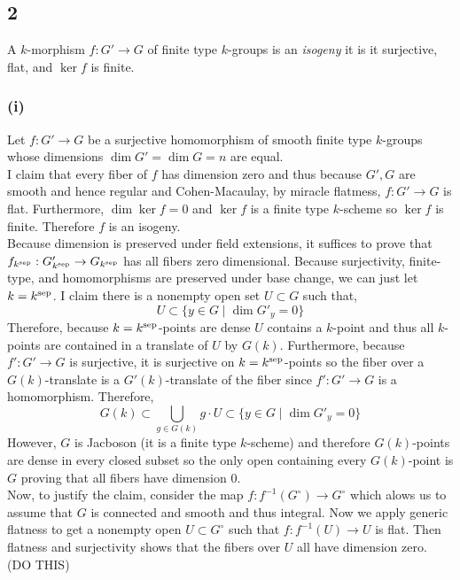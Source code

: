 \documentclass[12pt]{article}
\begin{document}
\subsection{2}

A $k$-morphism $f : G' \to G$ of finite type $k$-groups is an \textit{isogeny} it is it surjective, flat, and $\ker{f}$ is finite.

\subsubsection{(i)}

Let $f : G' \to G$ be a surjective homomorphism of smooth finite type $k$-groups whose dimensions $\dim{G'} = \dim{G} = n$ are equal. 
\bigskip\\
I claim that every fiber of $f$ has dimension zero and thus because $G', G$ are smooth and hence regular and Cohen-Macaulay, by miracle flatmess, $f : G' \to G$ is flat. Furthermore, $\dim{\ker{f}} = 0$ and $\ker{f}$ is a finite type $k$-scheme so $\ker{f}$ is finite. Therefore $f$ is an isogeny.
\bigskip\\
Because dimension is preserved under field extensions, it suffices to prove that $f_{k^{\mathrm{sep}}} : G'_{k^{\mathrm{sep}}} \to G_{k^{\mathrm{sep}}}$ has all fibers zero dimensional. Because surjectivity, finite-type, and homomorphisms are preserved under base change, we can just let $k = k^{\mathrm{sep}}$. I claim there is a nonempty open set $U \subset G$ such that,
\[ U \subset \{ y \in G \mid \dim{G'_y} = 0 \} \]
Therefore, because $k = k^{\mathrm{sep}}$-points are dense $U$ contains a $k$-point and thus all $k$-points are contained in a translate of $U$ by $G(k)$. Furthermore, because $f' : G' \to G$ is surjective, it is surjective on $k = k^{\mathrm{sep}}$-points so the fiber over a $G(k)$-translate is a $G'(k)$-translate of the fiber since $f' : G' \to G$ is a homomorphism. Therefore,
\[ G(k) \subset \bigcup_{g \in G(k)} g \cdot U \subset \{ y \in G \mid \dim{G'_y} = 0 \} \]
However, $G$ is Jacboson (it is a finite type $k$-scheme) and therefore $G(k)$-points are dense in every closed subset so the only open containing every $G(k)$-point is $G$ proving that all fibers have dimension $0$.
\bigskip\\
Now, to justify the claim, consider the map $f : f^{-1}(G^\circ) \to G^\circ$ which alows us to assume that $G$ is connected and smooth and thus integral. Now we apply generic flatness to get a nonempty open $U \subset G^\circ$ such that $f : f^{-1}(U) \to U$ is flat. Then flatness and surjectivity shows that the fibers over $U$ all have dimension zero. (DO THIS)
\end{document}
